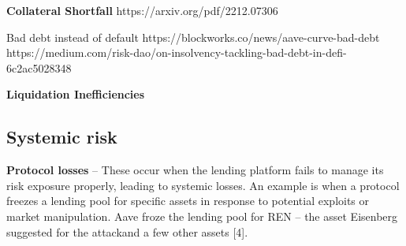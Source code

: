 \documentclass{article} %
\theoremstyle{plain}
\theoremstyle{definition} %
\begin{document}
\textbf{Collateral Shortfall}
https://arxiv.org/pdf/2212.07306

Bad debt instead of default
https://blockworks.co/news/aave-curve-bad-debt
https://medium.com/risk-dao/on-insolvency-tackling-bad-debt-in-defi-6c2ac5028348

\textbf{Liquidation Inefficiencies}


\subsection{Systemic risk}
\textbf{Protocol losses} -- These occur when the lending platform fails to manage its risk exposure properly, leading to systemic losses. An example is when a protocol freezes a lending pool for specific assets in response to potential exploits or market manipulation.
Aave froze the lending pool for REN – the asset Eisenberg suggested for the attackand a few other assets [4].



\end{document}
